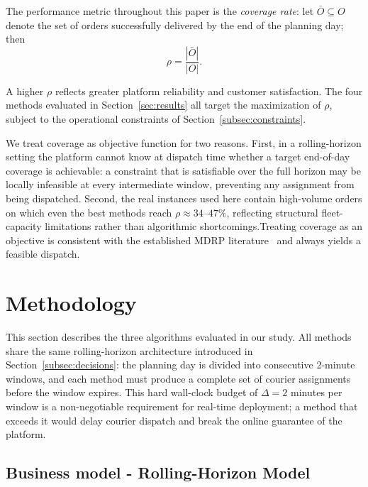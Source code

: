 \documentclass[runningheads]{llncs}
\begin{document}
The performance metric throughout this paper is the
\emph{coverage rate}: let $\bar{O} \subseteq O$ denote the set
of orders successfully delivered by the end of the planning day;
then
\vspace{-6pt}
\begin{equation}\label{eq:coverage}
    \rho = \frac{|\bar{O}|}{|O|}.
\end{equation}

\noindent
A higher $\rho$ reflects greater platform reliability and
customer satisfaction.
The four methods evaluated in Section~\ref{sec:results} all target the maximization of $\rho$, subject to the operational constraints of Section~\ref{subsec:constraints}.

We treat coverage as objective function for two reasons. First, in a rolling-horizon setting the platform cannot know at dispatch time whether a target end-of-day coverage is achievable: a constraint that is satisfiable over the full horizon may be
locally infeasible at every intermediate window, preventing any assignment from being dispatched. Second, the real instances used here contain high-volume orders on which even the best methods reach $\rho \approx 34$--$47\%$, reflecting structural fleet-capacity limitations rather than algorithmic shortcomings.Treating coverage as an objective is consistent with the established MDRP literature~\cite{ref-reyes2018,ref-ulmer2021} and always yields a feasible dispatch.


\section{Methodology}\label{sec:methodology}

This section describes the three algorithms evaluated in our study. All methods share the same rolling-horizon architecture introduced in Section~\ref{subsec:decisions}: the planning day is divided into consecutive 2-minute windows, and each method must produce a complete set of courier assignments before the window expires. This hard wall-clock budget of $\Delta = 2$ minutes per window is a non-negotiable requirement for real-time deployment; a method that exceeds it would delay courier dispatch and break the online guarantee of the platform. 





\subsection{Business model - Rolling-Horizon Model}
\label{subsec:Business model}
\end{document}
